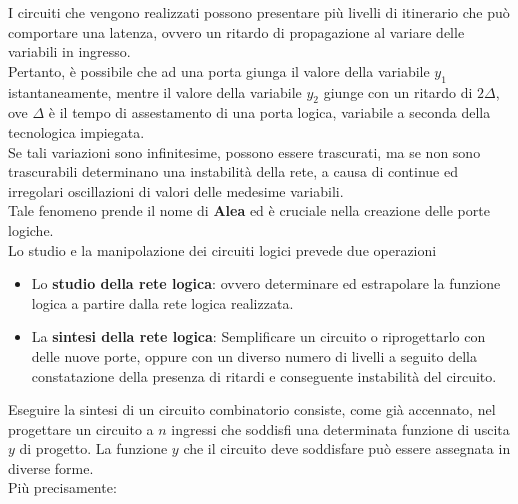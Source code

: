 \documentclass[a4paper]{extarticle}
\begin{document}
\noindent
I circuiti che vengono realizzati possono presentare più livelli di itinerario che può comportare una latenza, ovvero un ritardo di propagazione al variare delle variabili in ingresso.\\
Pertanto, è possibile che ad una porta giunga il valore della variabile \(y_1\) istantaneamente, mentre il valore della variabile \(y_2\) giunge con un ritardo di \(2\Delta\), ove \(\Delta\) è il tempo di assestamento di una porta logica, variabile a seconda della tecnologica impiegata.\\
Se tali variazioni sono infinitesime, possono essere trascurati, ma se non sono trascurabili determinano una instabilità della rete, a causa di continue ed irregolari oscillazioni di valori delle medesime variabili.\\
Tale fenomeno prende il nome di \textbf{Alea} ed è cruciale nella creazione delle porte logiche.\\
Lo studio e la manipolazione dei circuiti logici prevede due operazioni
\begin{itemize}
    \item Lo \textbf{studio della rete logica}: ovvero determinare ed estrapolare la funzione logica a partire dalla rete logica realizzata.

    \item La \textbf{sintesi della rete logica}: Semplificare un circuito o riprogettarlo con delle nuove porte, oppure con un diverso numero di livelli a seguito della constatazione della presenza di ritardi e conseguente instabilità del circuito.
\end{itemize}

\noindent
Eseguire la sintesi di un circuito combinatorio consiste, come già accennato, nel progettare un circuito a \(n\) ingressi che soddisfi una determinata funzione di uscita \(y\) di progetto. La funzione \(y\) che il circuito deve soddisfare può essere assegnata in diverse forme.\\
Più precisamente:
\end{document}

